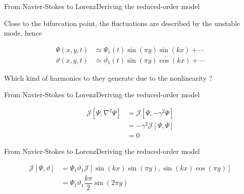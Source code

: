 \documentclass[usenames, dvipsnames, aspectratio=169]{beamer}
\newcommand{\lap}{\nabla^2}
\begin{document}
\begin{frame}[t, c]{From Navier-Stokes to Lorenz}{Deriving the reduced-order model}
  \vfill
  \large

  Close to the bifurcation point, the fluctuations are described by the unstable mode, hence

  \[
  \begin{aligned}
    \Psi(x, y, t) & \simeq \Psi_1(t) \sin(\pi y) \sin(kx) + \cdots \\
    \vartheta(x, y, t) & \simeq \vartheta_1(t) \sin(\pi y) \cos(kx) + \cdots
  \end{aligned}
  \]

  \bigskip

  Which kind of harmonics to they generate due to the nonlinearity ?

  \vfill
\end{frame}

\begin{frame}[t, c]{From Navier-Stokes to Lorenz}{Deriving the reduced-order model}
  \vfill
  \large

  \[
  \begin{aligned}
    \mathcal{J} \left[ \Psi, \lap \Psi \right] & = \mathcal{J} \left[ \Psi, -\gamma^2 \Psi \right] \\
    & = -\gamma^2 \mathcal{J} \left[ \Psi, \Psi \right] \\
    & = 0
  \end{aligned}
  \]

  \vfill
\end{frame}

\begin{frame}[t, c]{From Navier-Stokes to Lorenz}{Deriving the reduced-order model}
  \vfill
  \large

  \[
  \begin{aligned}
    \mathcal{J} \left[ \Psi, \vartheta \right] & = \Psi_1 \vartheta_1 \mathcal{J} \left[ \sin(kx) \sin(\pi y), \sin(kx) \cos(\pi y) \right] \\
    & = \Psi_1 \vartheta_1 \dfrac{k \pi}{2} \sin( 2\pi y)
  \end{aligned}
  \]

  \vfill
\end{frame}
\end{document}
